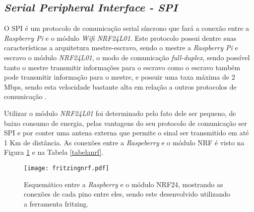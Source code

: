 \subsection{\emph{Serial Peripheral Interface - SPI}}
    O SPI é um protocolo de comunicação serial síncrono que fará a conexão entre a \emph{Raspberry Pi} e o módulo \emph{Wifi NRF24L01}. Este protocolo possui dentre suas características a arquitetura mestre-escravo, sendo o mestre a \emph{Raspberry Pi} e escravo o módulo \emph{NRF24L01}, o modo de comunicação \emph{full-duplex}, sendo possível tanto o mestre transmitir informações para o escravo como o escravo também pode transmitir informação para o mestre, e possuir uma taxa máxima de 2 Mbps, sendo esta velocidade bastante alta em relação a outros protocolos de comunicação \cite{spi2}.\par
    Utilizar o módulo \emph{NRF24L01} foi determinado pelo fato dele ser pequeno, de baixo consumo de energia, pelas vantagens do seu protocolo de comunicação ser SPI e por conter uma antena externa que permite o sinal ser transmitido em até 1 Km de distância.
    As conexões entre a \emph{Raspeberry} e o módulo NRF é visto na Figura \ref{fritizingnrf} e na Tabela \ref{tabelanrf}.  
    \begin{figure}[H]
    \centering
    \texttt{[image: fritzingnrf.pdf]}
    \caption{Esquemático entre a \emph{Raspberry} e o módulo NRF24, mostrando as conexões de cada pino entre eles, sendo este desenvolvido utilizando a ferramenta fritzing.}
    \label{fritizingnrf}
\end{figure}  
